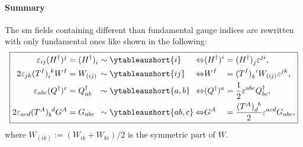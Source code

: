\paragraph{Summary}
The \gls{sm} fields containing different than fundamental gauge indices are rewritten with only fundamental ones like shown in the following:
\begin{equation}
	\boxed{
		\begin{alignedat}{5}
			\eps_{i j} \tensor{(H^{\dagger})}{^{j}} &= \tensor{(H^{\dagger})}{_{i}}
			&&\sim \ytableaushort{i}
			&&\Leftrightarrow
			&&\tensor{(H^{\dagger})}{^{i}} &&= \tensor{(H^{\dagger})}{_{j}} \eps^{j i}
			\text{,} \\
			2 \eps_{j k} \tensor{(T^{I})}{_{i} ^{k}} W^{I} &= W_{(i j)}
			&&\sim \ytableaushort{ij}
			&&\Leftrightarrow
			&& W^{I} && = \tensor{(T^{I})}{_{k} ^{i}} W_{(i j)} \eps^{j k}
			\text{,} \\
			\eps_{a b c} \tensor{(Q^{\dagger})}{^c} &= Q_{a b}^{\dagger}
			&&\sim \ytableaushort{a,b}
			&&\Leftrightarrow
			&& \tensor{(Q^{\dagger})}{^a} &&= \frac{1}{2} \eps^{a b c} Q^{\dagger}_{b c}
			\text{,} \\
			2 \eps_{a c d} \tensor{(T^{A})}{_{b} ^{d}} G^{A} &= G_{a b c}
			&&\sim \ytableaushort{ab,c}
			&&\Leftrightarrow
			&& G^{A} &&= \frac{\tensor{(T^{A})}{_{d} ^{b}}}{2} \eps^{a c d} G_{a b c}
			\text{,}
		\end{alignedat}
	}
\end{equation}
where $ W_{(i k)} := (W_{i k} + W_{k i})/ 2 $ is the symmetric part of $ W $.
